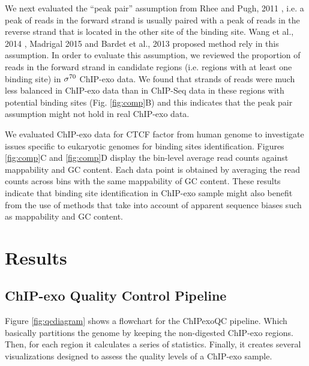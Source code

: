 \documentclass[11pt]{article}\usepackage[]{graphicx}\usepackage[]{color}
\begin{document}
We next evaluated the ``peak pair'' assumption from Rhee and Pugh,
2011 \cite{exo1}, i.e. a peak of reads in the forward strand is
usually paired with a peak of reads in the reverse strand that is
located in the other site of the binding site. Wang et al., 2014
\cite{mace}, Madrigal 2015 \cite{cexor} and Bardet et al., 2013
\cite{peakzilla} proposed method rely in this assumption. In order to
evaluate this assumption, we reviewed the proportion of reads in the
forward strand in candidate regions (i.e. regions with at least one
binding site) in $\sigma^{70}$ ChIP-exo data. We found that strands of reads
were much less balanced in ChIP-exo data than in ChIP-Seq data in
these regions with potential binding sites (Fig. \ref{fig:comp}B) and
this indicates that the peak pair assumption might not hold in real
ChIP-exo data.

We evaluated ChIP-exo data for CTCF factor from human genome
\cite{exo1} to investigate issues specific to eukaryotic genomes for
binding sites identification. Figures \ref{fig:comp}C and
\ref{fig:comp}D display the bin-level average read counts against
mappability and GC content. Each data point is obtained by averaging
the read counts across bins with the same mappability of GC
content. These results indicate that binding site identification in
ChIP-exo sample might also benefit from the use of methods that take
into account of apparent sequence biases such as mappability and GC
content.

\section{Results}
\label{sec:results}

\subsection{ChIP-exo Quality Control Pipeline}
\label{sec:QC}

Figure \ref{fig:qcdiagram} shows a flowchart for the ChIPexoQC
pipeline. Which basically partitions the genome by keeping the
non-digested ChIP-exo regions. Then, for each region it calculates a
series of statistics. Finally, it creates several visualizations
designed to assess the quality levels of a ChIP-exo sample.
\end{document}
